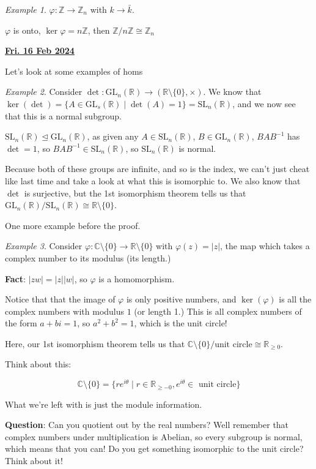 \documentclass[12pt]{article}
\renewcommand{\date}[1]{\underline{\bf #1}}
\def\phi{\varphi}
\def\gl{\text{GL}}
\def\sl{\text{SL}}
\def\Z{{\mathbb Z}}
\def\R{{\mathbb R}}
\def\C{{\mathbb C}}
\theoremstyle{remark}
\theoremstyle{remark}
\theoremstyle{remark}
\newtheorem{example}{Example}
\theoremstyle{remark}
\theoremstyle{remark}
\begin{document}
\begin{example}
  $\phi: \Z \to \Z_n$ with $k \to \bar k$.

  $\phi$ is onto, $\ker \phi = n \Z$, then $\Z / n\Z \cong \Z_n$
\end{example}

\date{Fri. 16 Feb 2024}

Let's look at some examples of homs

\begin{example}
  Consider $\det: \gl_n(\R) \to (\R \setminus \{0\}, \times)$. We know that
  $\ker(\det) = \{ A \in \gl_s(\R) \mid \det(A) = 1 \} = \sl_n(\R)$, and we now
  see that this is a normal subgroup.

  $\sl_n(\R) \trianglelefteq \gl_n(\R)$, as given any $A \in \sl_n(\R)$, $B \in
  \gl_n(\R)$, $BAB^{-1}$ has $\det = 1$, so $BAB^{-1} \in \sl_n(\R)$, so
  $\sl_n(\R)$ is normal.
\end{example}

Because both of these groups are infinite, and so is the index, we can't just
cheat like last time and take a look at what this is isomorphic to. We also know
that $\det$ is surjective, but the 1st isomorphism theorem tells us that
$\gl_n(\R) / \sl_n(\R) \cong \R \setminus \{0\}$.

One more example before the proof.

\begin{example}
  Consider $\varphi: \C \setminus \{0\} \to \R \setminus \{0\}$ with $\varphi(z)
  = |z|$, the map which takes a complex number to its modulus (its length.)

  {\bf Fact}: $|zw| = |z| |w|$, so $\varphi$ is a homomorphism.

  Notice that that the image of $\varphi$ is only positive numbers, and
  $\ker(\varphi)$ is all the complex numbers with modulus $1$ (or length 1.)
  This is all complex numbers of the form $a + bi = 1$, so $a^2 + b^2 = 1$,
  which is the unit circle!

  Here, our 1st isomorphism theorem tells us that $\C \setminus \{0\} /
  \text{unit circle} \cong \R_{\ge 0}$.

  Think about this:

  \[
    \C \setminus \{0\} = \{re^{i \theta} \mid r \in \R_{\ge -0}, e^{i\theta} \in
    \text{ unit circle}\}
  \]

  What we're left with is just the module information.
\end{example}

{\bf Question}: Can you quotient out by the real numbers? Well remember that
complex numbers under multiplication is Abelian, so every subgroup is normal,
which means that you can! Do you get something isomorphic to the unit circle?
Think about it!
\end{document}
